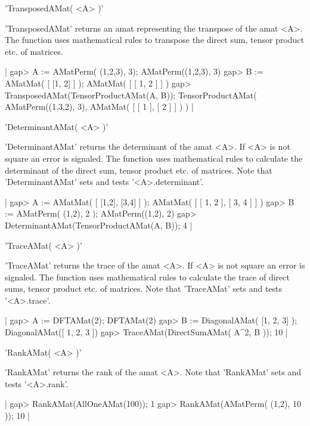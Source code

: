 
'TransposedAMat( <A> )'

'TransposedAMat' returns an amat representing the transpose of the 
amat <A>.
The function uses mathematical rules to transpose the direct sum, 
tensor product etc. of matrices.

|    gap> A := AMatPerm( (1,2,3), 3);
    AMatPerm((1,2,3), 3)
    gap> B := AMatMat( [ [1, 2] ] );
    AMatMat(
      [ [ 1, 2 ] ]
    )
    gap> TransposedAMat(TensorProductAMat(A, B));
    TensorProductAMat(
      AMatPerm((1,3,2), 3),
      AMatMat(
        [ [ 1 ], [ 2 ] ]
      )
    ) |


'DeterminantAMat( <A> )'

'DeterminantAMat' returns the determinant of the amat <A>. If 
<A> is not square an error is signaled.
The function uses mathematical rules to calculate the determinant of
the direct sum, tensor product etc. of matrices.
Note that 'DeterminantAMat' sets and tests '<A>.determinant'.

|    gap> A := AMatMat( [ [1,2], [3,4] ] );
    AMatMat(
      [ [ 1, 2 ], [ 3, 4 ] ]
    )
    gap> B := AMatPerm( (1,2), 2 );
    AMatPerm((1,2), 2)
    gap> DeterminantAMat(TensorProductAMat(A, B));
    4 |


'TraceAMat( <A> )'

'TraceAMat' returns the trace of the amat <A>. If 
<A> is not square an error is signaled.
The function uses mathematical rules to calculate the trace of
direct sums, tensor product etc. of matrices.
Note that 'TraceAMat' sets and tests '<A>.trace'.

|    gap> A := DFTAMat(2);
    DFTAMat(2)
    gap> B := DiagonalAMat( [1, 2, 3] );
    DiagonalAMat([ 1, 2, 3 ])
    gap> TraceAMat(DirectSumAMat( A^2, B ));
    10 |


'RankAMat( <A> )'

'RankAMat' returns the rank of the amat <A>. Note that 'RankAMat'
sets and tests '<A>.rank'.

|    gap> RankAMat(AllOneAMat(100));
    1
    gap> RankAMat(AMatPerm( (1,2), 10 ));
    10 |

